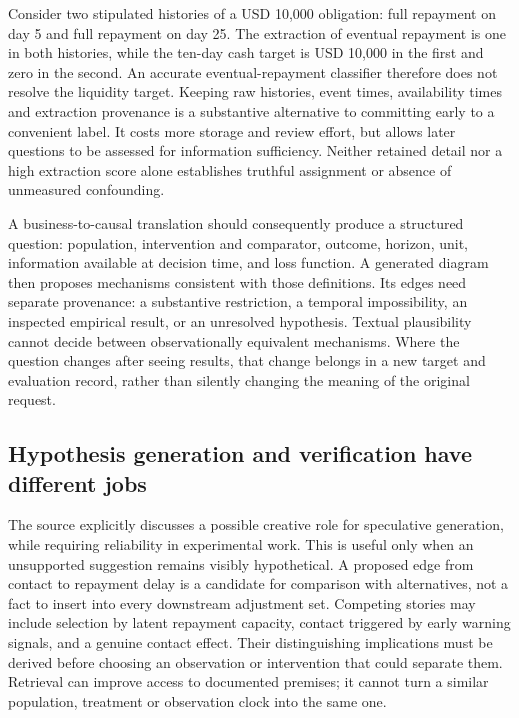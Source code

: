 Consider two stipulated histories of a USD 10,000 obligation: full repayment on
day 5 and full repayment on day 25. The extraction of eventual repayment is one
in both histories, while the ten-day cash target is USD 10,000 in the first and
zero in the second. An accurate eventual-repayment classifier therefore does not
resolve the liquidity target. Keeping raw histories, event times, availability
times and extraction provenance is a substantive alternative to committing early
to a convenient label. It costs more storage and review effort, but allows later
questions to be assessed for information sufficiency. Neither retained detail nor
a high extraction score alone establishes truthful assignment or absence of
unmeasured confounding.~\citep{exec24_scimethod_reference}

A business-to-causal translation should consequently produce a structured question:
population, intervention and comparator, outcome, horizon, unit, information available
at decision time, and loss function. A generated diagram then proposes mechanisms
consistent with those definitions. Its edges need separate provenance: a substantive
restriction, a temporal impossibility, an inspected empirical result, or an
unresolved hypothesis. Textual plausibility cannot decide between observationally
equivalent mechanisms. Where the question changes after seeing results, that change
belongs in a new target and evaluation record, rather than silently changing the
meaning of the original request.

\subsection{Hypothesis generation and verification have different jobs}

The source explicitly discusses a possible creative role for speculative generation,
while requiring reliability in experimental work. This is useful only when an
unsupported suggestion remains visibly hypothetical. A proposed edge from contact
to repayment delay is a candidate for comparison with alternatives,
not a fact to insert into every downstream adjustment set. Competing stories may
include selection by latent repayment capacity, contact triggered by early warning
signals, and a genuine contact effect. Their distinguishing implications must be
derived before choosing an observation or intervention that could separate them.
Retrieval can improve access to documented premises; it cannot turn a similar
population, treatment or observation clock into the same one.

